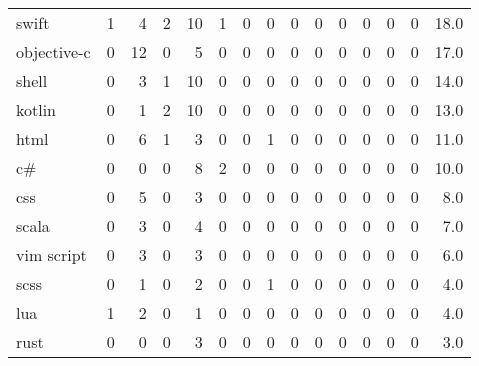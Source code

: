 \begin{tabular}{lrrrrrrrrrrrrrr}
swift         &        1 &       4 &          2 &              10 &                1 &       0 &          0 &          0 &         0 &         0 &      0 &             0 &         0 &     18.0 \\
objective-c   &        0 &      12 &          0 &               5 &                0 &       0 &          0 &          0 &         0 &         0 &      0 &             0 &         0 &     17.0 \\
shell         &        0 &       3 &          1 &              10 &                0 &       0 &          0 &          0 &         0 &         0 &      0 &             0 &         0 &     14.0 \\
kotlin        &        0 &       1 &          2 &              10 &                0 &       0 &          0 &          0 &         0 &         0 &      0 &             0 &         0 &     13.0 \\
html          &        0 &       6 &          1 &               3 &                0 &       0 &          1 &          0 &         0 &         0 &      0 &             0 &         0 &     11.0 \\
c\#            &        0 &       0 &          0 &               8 &                2 &       0 &          0 &          0 &         0 &         0 &      0 &             0 &         0 &     10.0 \\
css           &        0 &       5 &          0 &               3 &                0 &       0 &          0 &          0 &         0 &         0 &      0 &             0 &         0 &      8.0 \\
scala         &        0 &       3 &          0 &               4 &                0 &       0 &          0 &          0 &         0 &         0 &      0 &             0 &         0 &      7.0 \\
vim script    &        0 &       3 &          0 &               3 &                0 &       0 &          0 &          0 &         0 &         0 &      0 &             0 &         0 &      6.0 \\
scss          &        0 &       1 &          0 &               2 &                0 &       0 &          1 &          0 &         0 &         0 &      0 &             0 &         0 &      4.0 \\
lua           &        1 &       2 &          0 &               1 &                0 &       0 &          0 &          0 &         0 &         0 &      0 &             0 &         0 &      4.0 \\
rust          &        0 &       0 &          0 &               3 &                0 &       0 &          0 &          0 &         0 &         0 &      0 &             0 &         0 &      3.0 \\

\end{tabular}
